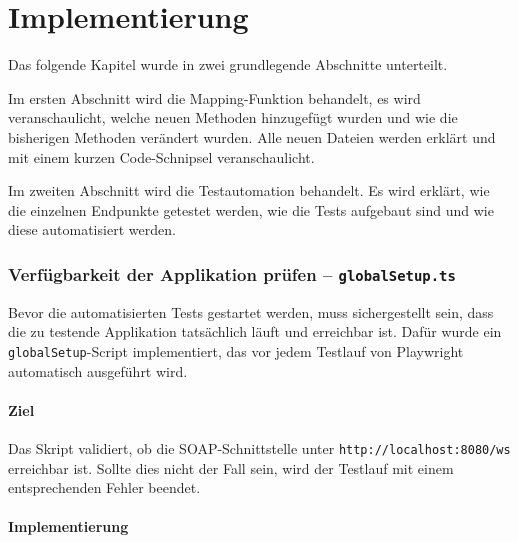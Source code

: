 \chapter{Implementierung}
\vspace{-3em}
Das folgende Kapitel wurde in zwei grundlegende Abschnitte unterteilt. 

Im ersten Abschnitt wird die Mapping-Funktion behandelt, es wird veranschaulicht, welche neuen Methoden hinzugefügt wurden und wie die bisherigen Methoden verändert wurden.
Alle neuen Dateien werden erklärt und mit einem kurzen Code-Schnipsel veranschaulicht.

Im zweiten Abschnitt wird die Testautomation behandelt. Es wird erklärt, wie die einzelnen Endpunkte getestet werden, wie die Tests aufgebaut sind und wie diese automatisiert werden. 







\clearpage
\subsection{Verfügbarkeit der Applikation prüfen – \texttt{globalSetup.ts}}

Bevor die automatisierten Tests gestartet werden, muss sichergestellt sein, dass die zu testende Applikation tatsächlich läuft und erreichbar ist. Dafür wurde ein \texttt{globalSetup}-Script implementiert, das vor jedem Testlauf von Playwright automatisch ausgeführt wird.

\subsubsection*{Ziel}

Das Skript validiert, ob die SOAP-Schnittstelle unter \texttt{http://localhost:8080/ws} erreichbar ist. Sollte dies nicht der Fall sein, wird der Testlauf mit einem entsprechenden Fehler beendet.

\subsubsection*{Implementierung}

